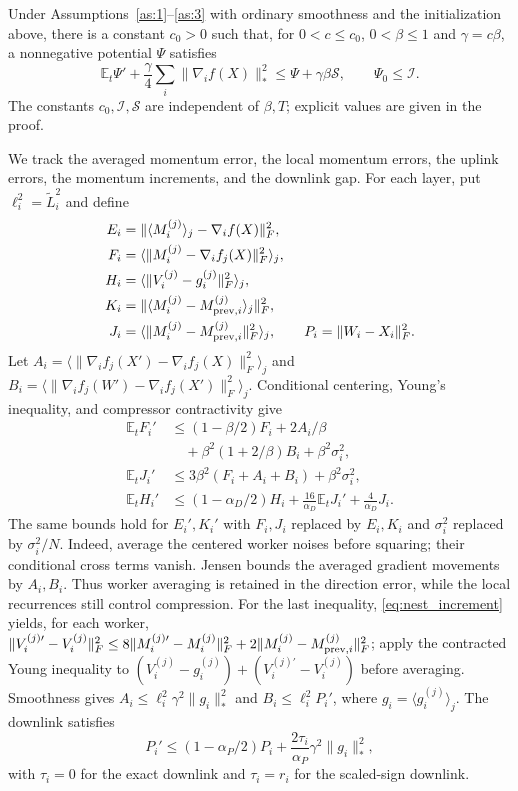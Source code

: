 \begin{codex}
\begin{lemma}\label{lem:nest_smooth_tracking}
Under Assumptions~\ref{as:1}--\ref{as:3} with ordinary smoothness and the
initialization above, there is a
constant $c_0>0$ such that, for $0<c\le c_0$, $0<\beta\le1$ and
$\gamma=c\beta$, a nonnegative potential $\Psi$ satisfies
\[
 \mathbb E_t\Psi'+\frac\gamma4\sum_i\|\nabla_i f(X)\|_*^2
 \le\Psi+\gamma\beta\mathcal S,\qquad \Psi_0\le\mathcal I.
\]
The constants $c_0,\mathcal I,\mathcal S$ are independent of $\beta,T$;
explicit values are given in the proof.
\end{lemma}
\begin{paperproof}
We track the averaged momentum error, the local momentum errors, the
uplink errors, the momentum increments, and the downlink gap. For each
layer, put $\ell_i^2=\tilde L_i^2$ and define
\begin{align*}
 E_i&=\|\langle M_i^{(j)}\rangle_j-\nabla_i f(X)\|_F^2,\\
 F_i&=\langle\|M_i^{(j)}-\nabla_i f_j(X)\|_F^2\rangle_j,\\
 H_i&=\langle\|V_i^{(j)}-g_i^{(j)}\|_F^2\rangle_j,\\
 K_i&=\|\langle M_i^{(j)}-M_{{\rm prev},i}^{(j)}\rangle_j\|_F^2,\\
 J_i&=\langle\|M_i^{(j)}-M_{{\rm prev},i}^{(j)}\|_F^2\rangle_j,
 \qquad P_i=\|W_i-X_i\|_F^2.
\end{align*}
Let $A_i=\langle\|\nabla_i f_j(X')-\nabla_i f_j(X)\|_F^2\rangle_j$
and $B_i=\langle\|\nabla_i f_j(W')-\nabla_i f_j(X')\|_F^2\rangle_j$.
Conditional centering, Young's inequality, and compressor contractivity give
\begin{align}
 \mathbb E_t F_i'&\le(1-\beta/2)F_i+2A_i/\beta\nonumber\\
 &\quad+\beta^2(1+2/\beta)B_i+\beta^2\sigma_i^2,\nonumber\\
 \mathbb E_t J_i'&\le3\beta^2(F_i+A_i+B_i)+\beta^2\sigma_i^2,
 \label{eq:nest_tracking}\\
 \mathbb E_t H_i'&\le(1-\alpha_D/2)H_i
       +\frac{16}{\alpha_D}\mathbb E_tJ_i'
       +\frac4{\alpha_D}J_i.\nonumber
\end{align}
The same bounds hold for $E_i',K_i'$ with $F_i,J_i$ replaced by
$E_i,K_i$ and $\sigma_i^2$ replaced by $\sigma_i^2/N$.
Indeed, average the centered worker noises before squaring; their conditional
cross terms vanish. Jensen bounds the averaged gradient movements by
$A_i,B_i$. Thus worker averaging is retained in the direction error, while
the local recurrences still control compression.
For the last inequality, \eqref{eq:nest_increment} yields, for each worker,
$\|V_i^{(j)\prime}-V_i^{(j)}\|_F^2
 \le8\|M_i^{(j)\prime}-M_i^{(j)}\|_F^2
       +2\|M_i^{(j)}-M_{{\rm prev},i}^{(j)}\|_F^2$;
apply the contracted Young inequality to
$(V_i^{(j)}-g_i^{(j)})+(V_i^{(j)\prime}-V_i^{(j)})$
before averaging. Smoothness gives
$A_i\le\ell_i^2\gamma^2\|g_i\|_*^2$ and
$B_i\le\ell_i^2P_i'$, where $g_i=\langle g_i^{(j)}\rangle_j$.
The downlink satisfies
\[
 P_i'\le(1-\alpha_P/2)P_i+
       \frac{2\tau_i}{\alpha_P}\gamma^2\|g_i\|_*^2,
\]
with $\tau_i=0$ for the exact downlink and $\tau_i=r_i$ for the
scaled-sign downlink.


\end{paperproof}
\end{codex}
